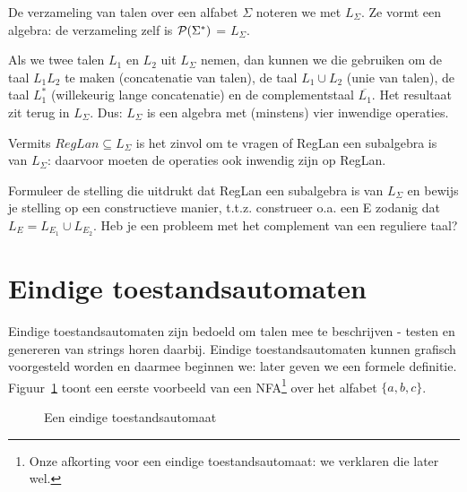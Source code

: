 De verzameling van talen over een alfabet $\Sigma$ noteren we met
$L_\Sigma$. Ze vormt een algebra: de verzameling zelf is ${\cal
P}(\Sigma^*)$ = $L_\Sigma$.


Als we twee talen $L_1$ en $L_2$ uit $L_\Sigma$ nemen, dan kunnen we
die gebruiken om de taal $L_1L_2$ te maken (concatenatie van talen),
de taal $L_1 \cup L_2$ (unie van talen), de taal $L_1^*$
(willekeurig lange concatenatie) en de complementstaal $\overline{L_1}$. Het
resultaat zit terug in $L_\Sigma$. Dus: $L_\Sigma$ is een algebra met
(minstens) vier inwendige operaties.


Vermits $RegLan \subseteq L_\Sigma$ is het zinvol om te vragen of
RegLan een subalgebra is van $L_\Sigma$: daarvoor moeten de operaties
ook inwendig zijn op RegLan.


Formuleer de stelling die uitdrukt dat RegLan een subalgebra is van
$L_\Sigma$ en bewijs je stelling op een constructieve manier,
t.t.z. construeer o.a. een E zodanig dat $L_E = L_{E_1} \cup L_{E_2}$.
Heb je een probleem met het complement van een reguliere taal?


\clearpage

\section{Eindige toestandsautomaten}

Eindige toestandsautomaten zijn bedoeld om talen mee te beschrijven -
testen en genereren van strings horen daarbij. Eindige
toestandsautomaten kunnen grafisch voorgesteld worden en daarmee
beginnen we: later geven we een formele definitie. Figuur~\ref{fsa1}
toont een eerste voorbeeld van een NFA\footnote{Onze afkorting voor
een eindige toestandsautomaat: we verklaren die later wel.} over het
alfabet $\{a,b,c\}$.

\begin{figure}[h]
\caption{Een eindige toestandsautomaat\label{fsa1}}
\end{figure}

